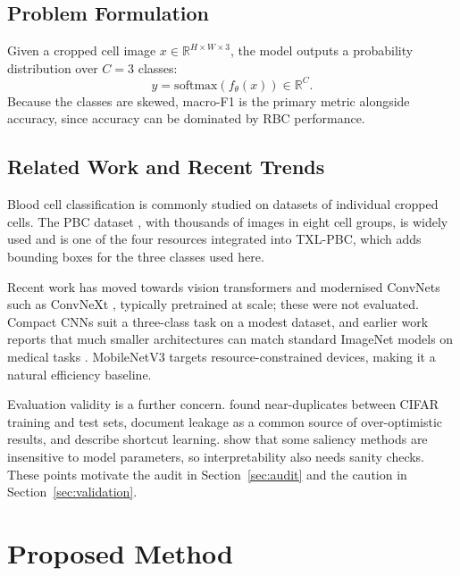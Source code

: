 \documentclass[11pt,a4paper]{article}
\begin{document}
\subsection{Problem Formulation}

Given a cropped cell image \(x \in \mathbb{R}^{H \times W \times 3}\), the model outputs a probability distribution over \(C = 3\) classes:
\[
\hat{y} = \mathrm{softmax}(f_\theta(x)) \in \mathbb{R}^{C}.
\]
Because the classes are skewed, macro-F1 is the primary metric alongside accuracy, since accuracy can be dominated by RBC performance.

\subsection{Related Work and Recent Trends}\label{sec:related}

Blood cell classification is commonly studied on datasets of individual cropped cells. The PBC dataset \citep{acevedo2020pbc}, with thousands of images in eight cell groups, is widely used and is one of the four resources integrated into TXL-PBC, which adds bounding boxes for the three classes used here.

Recent work has moved towards vision transformers \citep{dosovitskiy2021vit} and modernised ConvNets such as ConvNeXt \citep{liu2022convnext}, typically pretrained at scale; these were not evaluated. Compact CNNs suit a three-class task on a modest dataset, and earlier work reports that much smaller architectures can match standard ImageNet models on medical tasks \citep{raghu2019transfusion}. MobileNetV3 \citep{howard2019mobilenetv3} targets resource-constrained devices, making it a natural efficiency baseline.

Evaluation validity is a further concern. \citet{barz2020purging} found near-duplicates between CIFAR training and test sets, \citet{kapoor2023leakage} document leakage as a common source of over-optimistic results, and \citet{geirhos2020shortcut} describe shortcut learning. \citet{adebayo2018sanity} show that some saliency methods are insensitive to model parameters, so interpretability also needs sanity checks. These points motivate the audit in Section~\ref{sec:audit} and the caution in Section~\ref{sec:validation}.

\section{Proposed Method}\label{sec:method}
\end{document}
